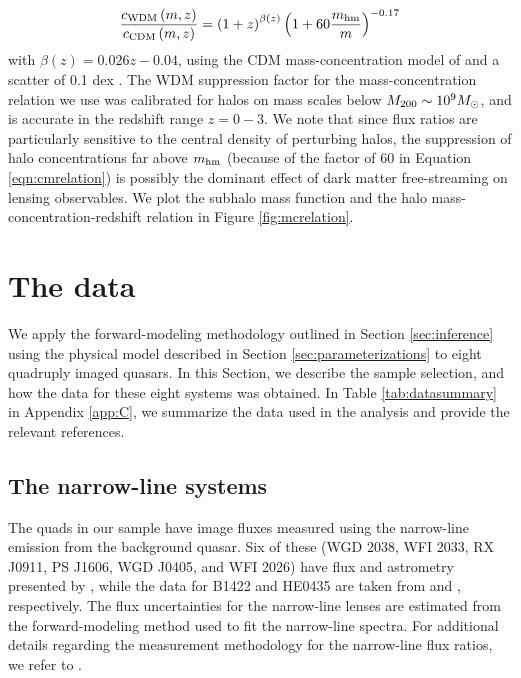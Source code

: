 \begin{equation}
\label{eqn:cmrelation}
\frac{c_{\rm{WDM}}\left(m, z\right)}{c_{\rm{CDM}}\left(m, z\right)} =  \left(1+z\right) ^{\beta\left(z\right)} \left(1+60\frac{m_{\rm{hm}}}{m}\right)^{-0.17}
\end{equation}
with $\beta \left(z\right) = 0.026z - 0.04$, using the CDM mass-concentration model of \cite{DiemerJoyce18} and a scatter of 0.1 dex \cite{Dutton++14}. The WDM suppression factor for the mass-concentration relation we use was calibrated for halos on mass scales below $M_{200} \sim 10^9 {M_{\odot}}$, and is accurate in the redshift range $z = 0 - 3$. We note that since flux ratios are particularly sensitive to the central density of perturbing halos, the suppression of halo concentrations far above ${m_{\rm{hm}}}$ (because of the factor of 60 in Equation \ref{eqn:cmrelation}) is possibly the dominant effect of dark matter free-streaming on lensing observables. We plot the subhalo mass function and the halo mass-concentration-redshift relation in Figure \ref{fig:mcrelation}. 

\section{The data}
\label{sec:data}
We apply the forward-modeling methodology outlined in Section \ref{sec:inference} using the physical model described in Section \ref{sec:parameterizations} to eight quadruply imaged quasars. In this Section, we describe the sample selection, and how the data for these eight systems was obtained. In Table \ref{tab:datasummary} in Appendix \ref{app:C}, we summarize the data used in the analysis and provide the relevant references.

\subsection{The narrow-line systems}
The quads in our sample have image fluxes measured using the narrow-line emission from the background quasar. Six of these (WGD 2038, WFI 2033, RX J0911, PS J1606, WGD J0405, and WFI 2026) have flux and astrometry presented by \cite{Nierenberg++19}, while the data for B1422 and HE0435 are taken from \cite{Nierenberg++14} and \cite{Nierenberg++17}, respectively. The flux uncertainties for the narrow-line lenses are estimated from the forward-modeling method used to fit the narrow-line spectra. For additional details regarding the measurement methodology for the narrow-line flux ratios, we refer to \cite{Nierenberg++17,Nierenberg++19}. 

